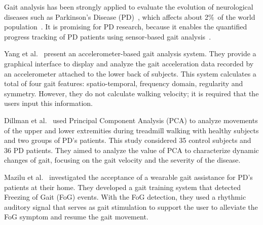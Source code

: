 \documentclass[10pt, conference, compsocconf]{IEEEtran}
\begin{document}
Gait analysis has been strongly applied to evaluate the evolution of neurological diseases such as Parkinson's Disease (PD)~\cite{gait2014}, which affects about 2$\%$\ of the world population~\cite{world2006neurological}. It is promising for PD research, because it enables the quantified progress tracking of  PD patients using sensor-based gait analysis~\cite{gaitusingsensorsreview2012}. 
 
Yang et al.~\cite{igait2012} present an accelerometer-based gait analysis system. They provide a graphical interface to display and analyze the gait acceleration data recorded by an accelerometer attached to the lower back of subjects. This system calculates a total of four gait features: spatio-temporal, frequency domain, regularity and symmetry. However, they do not calculate walking velocity; it is required that the users input this information. %

Dillman et al.~\cite{dillmann2014} used Principal Component Analysis (PCA) to analyze movements of the upper and lower extremities during treadmill walking with healthy subjects and two groups of PD's patients. This study considered 35 control subjects and 36 PD patients. They aimed to analyze the value of PCA to characterize dynamic changes of gait, focusing on the gait velocity and the severity of the disease.  %

Mazilu et al.~\cite{mazilu2015} investigated the acceptance of a wearable gait assistance for PD's patients at their home. They developed a gait training system that detected Freezing of Gait (FoG) events. With the FoG detection, they used a rhythmic auditory signal that serves as gait stimulation to support the user to alleviate the FoG symptom and resume the gait movement. %
\end{document}
